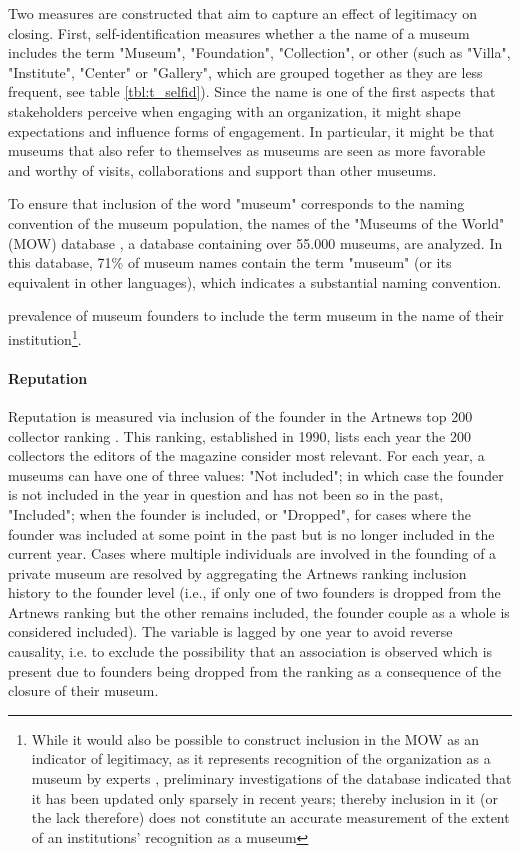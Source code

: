 \documentclass[12pt]{article}
\begin{document}
Two measures are constructed that aim to capture an effect of legitimacy on closing.
First, self-identification measures whether a the name of a museum includes the term "Museum", "Foundation", "Collection", or other (such as "Villa", "Institute", "Center" or "Gallery", which are grouped together as they are less frequent, see table \ref{tbl:t_selfid}).
Since the name is one of the first aspects that stakeholders perceive when engaging with an organization, it might shape expectations and influence forms of engagement.
In particular, it might be that museums that also refer to themselves as museums are seen as more favorable and worthy of visits, collaborations and support than other museums.


To ensure that inclusion of the word "museum" corresponds to the naming convention of the museum population, the names of the "Museums of the World" (MOW) database \parencite{deGruyter_2021_MOW}, a database containing over 55.000 museums, are analyzed.
In this database, 71\% of museum names contain the term "museum" (or its equivalent in other languages), which indicates a substantial naming convention. 

prevalence of museum founders to include the term museum in the name of their institution\footnote{While it would also be possible to construct inclusion in the MOW as an indicator of legitimacy, as it represents recognition of the organization as a museum by experts \parencite{Zuckerman_1999_illegitimacy}, preliminary investigations of the database indicated that it has been  updated only sparsely in recent years; thereby inclusion in it (or the lack therefore) does not constitute an accurate measurement of the extent of an institutions' recognition as a museum}.
\paragraph*{Reputation}


Reputation is measured via inclusion of the founder in the Artnews top 200 collector ranking \parencite{Artnews_ranking}.
This ranking, established in 1990, lists each year the 200 collectors the editors of the magazine consider most relevant.
For each year, a museums can have one of three values: "Not included"; in which case the founder is not included in the year in question and has not been so in the past, "Included"; when the founder is included, or "Dropped", for cases where the founder was included at some point in the past but is no longer included in the current year.
Cases where multiple individuals are involved in the founding of a private museum are resolved by aggregating the Artnews ranking inclusion history to the founder level (i.e., if only one of two founders is dropped from the Artnews ranking but the other remains included, the founder couple as a whole is considered included).
The variable is lagged by one year to avoid reverse causality, i.e. to exclude the possibility that an association is observed which is present due to founders being dropped from the ranking as a consequence of the closure of their museum.
\end{document}
